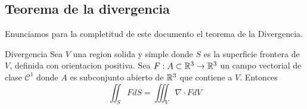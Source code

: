 \documentclass[../main.tex]{subfiles}
\begin{document}
\subsection{Teorema de la divergencia}
Enunciamos para la completitud de este documento el teorema de la Divergencia.
\begin{teorema}Divergencia
  Sea $V$ una region solida y simple donde $S$ es la superficie frontera de $V$, definida con orientacion positiva. Sea $F: A \subset \mathbb{R}^{3} \to \mathbb{R}^{3}$ un campo vectorial de clase $\mathcal{C}^{1}$ donde $A$ es subconjunto abierto de $\mathbb{R}^{3}$ que contiene a $V$. Entonces
  \begin{equation*}
    \iint_{S} F dS = \iiint_{V} \nabla \cdot F dV
  \end{equation*}
\end{teorema}
\end{document}
